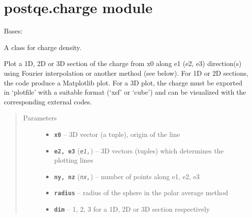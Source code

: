 \documentclass[letterpaper,10pt,english]{sphinxmanual}
\begin{document}
\section{postqe.charge module}
\label{postqe:postqe-charge-module}\label{postqe:module-postqe.charge}

\begin{fulllineitems}
\label{postqe:postqe.charge.Charge}
Bases: 

A class for charge density.

\begin{fulllineitems}
\label{postqe:postqe.charge.Charge.plot}
Plot a 1D, 2D or 3D section of the charge from x0 along e1 (e2, e3) direction(s) using Fourier interpolation
or another method (see below). For 1D or 2D sections, the code produce a Matplotlib plot. For a 3D plot, the
charge must be exported in `plotfile' with a suitable format (`xsf' or `cube') and can be visualized with
the corresponding external codes.
\begin{quote}\begin{description}
\item[{Parameters}] \leavevmode\begin{itemize}
\item {} 
\textbf{\texttt{x0}} -- 3D vector (a tuple), origin of the line

\item {} 
\textbf{\texttt{e2, e3}} (\emph{\texttt{e1,}}) -- 3D vectors (tuples) which determines the plotting lines

\item {} 
\textbf{\texttt{ny, nz}} (\emph{\texttt{nx,}}) -- number of points along e1, e2, e3

\item {} 
\textbf{\texttt{radius}} -- radius of the sphere in the polar average method

\item {} 
\textbf{\texttt{dim}} -- 1, 2, 3 for a 1D, 2D or 3D section respectively


\end{itemize}
\end{description}
\end{quote}
\end{fulllineitems}
\end{fulllineitems}
\end{document}
